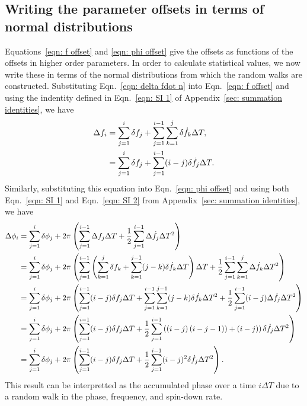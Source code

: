 \documentclass[../full_thesis/full_thesis.tex]{subfiles}
\begin{document}
\subsection{Writing the parameter offsets in terms of normal distributions}
Equations~\eqref{eqn: f offset} and \eqref{eqn: phi offset} give the offsets as
functions of the offsets in higher order parameters. In order to calculate
statistical values, we now write these in terms of the normal distributions
from which the random walks are constructed.  Substituting Eqn.~\eqref{eqn:
delta fdot n} into Eqn.~\eqref{eqn: f offset} and using the indentity defined
in Eqn.~\eqref{eqn: SI 1} of Appendix~\ref{sec: summation identities}, we have
\begin{align}
\Delta f_{i}  & = \sum_{j=1}^{i}\delta f_{j}
+ \sum_{j=1}^{i-1}\sum_{k=1}^{j}\delta \dot{f}_{k} \Delta T ,  \\
& = \sum_{j=1}^{i}\delta f_{j}
+ \sum_{j=1}^{i-1}(i-j)\delta \dot{f}_{j} \Delta T .
\label{eqn: delta f n}
\end{align}
Similarly, substituting this equation into Eqn.~\eqref{eqn: phi offset} and
using both Eqn.~\eqref{eqn: SI 1} and Eqn.~\eqref{eqn: SI 2} from
Appendix~\ref{sec: summation identities}, we have
\begin{align}
\begin{split}
\Delta\phi_{i} & = \sum_{j=1}^{i}\delta \phi_{j}
+ 2\pi \left(\sum_{j=1}^{i-1}\Delta f_{j}\Delta T
+ \frac{1}{2}\sum_{j=1}^{i-1}\Delta\dot{f}_{j}\Delta T^{2}\right) \\
& = \sum_{j=1}^{i}\delta \phi_{j} + 2\pi\left(\sum_{j=1}^{i-1}\left(\sum_{k=1}^{j}\delta f_{k}
+ \sum_{k=1}^{j-1}(j-k)\delta\dot{f}_{k}\Delta T\right)\Delta T
 + \frac{1}{2}\sum_{j=1}^{i-1}\sum_{k=1}^{j}\Delta\dot{f}_{k}\Delta T^{2} \right)  \\
& = \sum_{j=1}^{i}\delta \phi_{j} + 2\pi\left(\sum_{j=1}^{i-1}(i-j)\delta f_{j}\Delta T
 + \sum_{j=1}^{i-1}\sum_{k=1}^{j-1}(j-k)\delta\dot{f}_{k}\Delta T^{2}
 + \frac{1}{2}\sum_{j=1}^{i-1}(i-j)\Delta\dot{f}_{j}\Delta T^{2} \right)  \\
& = \sum_{j=1}^{i}\delta \phi_{j} + 2\pi\left(\sum_{j=1}^{i-1}(i-j)\delta f_{j}\Delta T
 + \frac{1}{2}\sum_{j=1}^{i-1}\left(\left(i-j\right)\left(i-j-1)\right)
 + (i-j)\right)\delta\dot{f}_{j}\Delta T^{2}\right)  \\
& = \sum_{j=1}^{i}\delta \phi_{j} + 2\pi\left(\sum_{j=1}^{i-1}(i-j)\delta f_{j}\Delta T
 + \frac{1}{2}\sum_{j=1}^{i-1}(i-j)^{2}\delta\dot{f}_{j}\Delta T^{2}\right).
\end{split}
\label{eqn: delta phi n}
\end{align}
This result can be interpretted as the accumulated phase over a time $i\Delta
T$ due to a random walk in the phase, frequency, and spin-down rate.
\end{document}
